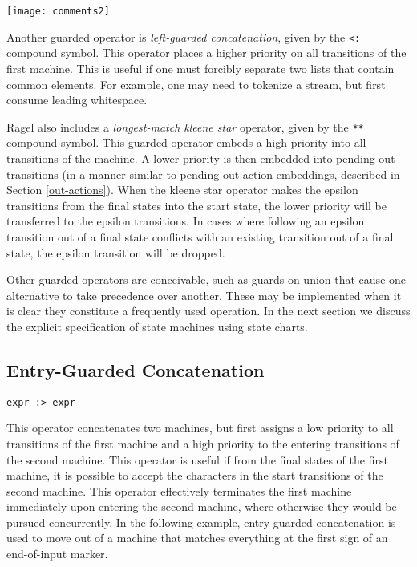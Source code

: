 \documentclass[letterpaper,11pt,oneside]{book}
\newcommand{\verbspace}{\vspace{10pt}}
\newcommand{\graphspace}{\vspace{10pt}}
\begin{document}
\graphspace
\begin{center}
\texttt{[image: comments2]}
\end{center}
\graphspace

Another guarded operator is {\em left-guarded concatenation}, given by the
\verb|<:| compound symbol. This operator places a higher priority on all
transitions of the first machine. This is useful if one must forcibly separate
two lists that contain common elements. For example, one may need to tokenize a
stream, but first consume leading whitespace.

Ragel also includes a {\em longest-match kleene star} operator, given by the
\verb|**| compound symbol. This 
guarded operator embeds a high
priority into all transitions of the machine. 
A lower priority is then embedded into pending out transitions
(in a manner similar to pending out action embeddings, described in Section
\ref{out-actions}).  When the kleene star operator makes the epsilon transitions from
the final states into the start state, the lower priority will be transferred
to the epsilon transitions. In cases where following an epsilon transition
out of a final state conflicts with an existing transition out of a final
state, the epsilon transition will be dropped.

Other guarded operators are conceivable, such as guards on union that cause one
alternative to take precedence over another. These may be implemented when it
is clear they constitute a frequently used operation.
In the next section we discuss the explicit specification of state machines
using state charts.

\subsection{Entry-Guarded Concatenation}

\verb|expr :> expr| 
\verbspace

This operator concatenates two machines, but first assigns a low
priority to all transitions
of the first machine and a high priority to the entering transitions of the
second machine. This operator is useful if from the final states of the first
machine, it is possible to accept the characters in the start transitions of
the second machine. This operator effectively terminates the first machine
immediately upon entering the second machine, where otherwise they would be
pursued concurrently. In the following example, entry-guarded concatenation is
used to move out of a machine that matches everything at the first sign of an
end-of-input marker.
\end{document}
